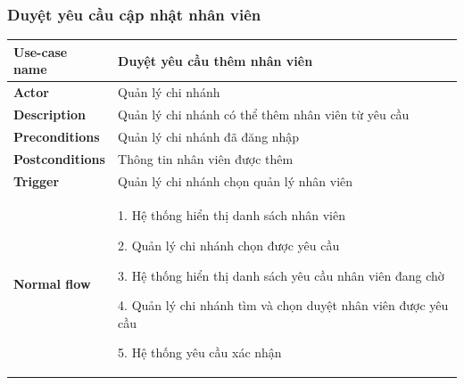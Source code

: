         \subsubsection{Duyệt yêu cầu cập nhật nhân viên}
        {
\setlength\extrarowheight{6pt}
            \begin{longtable}{| p{} | p{} |} 
                \hline
                    \textbf{Use-case name} 
                & 
                    Duyệt yêu cầu thêm nhân viên
                \\
                \hline
                    \textbf{Actor} 
                & 
                    Quản lý chi nhánh
                \\
                \hline
                    \textbf{Description} 
                & 
                    Quản lý chi nhánh có thể thêm nhân viên từ yêu cầu
                \\
                \hline
                    \textbf{Preconditions} 
                &
                    Quản lý chi nhánh đã đăng nhập
                \\
                \hline
                    \textbf{Postconditions} 
                & 
                    Thông tin nhân viên được thêm
                \\
                \hline
                    \textbf{Trigger} 
                & 
                    Quản lý chi nhánh chọn quản lý nhân viên
                \\
                \hline
                \begin{flushleft}
                    \textbf{Normal flow}
                \end{flushleft}
                & 
                1. Hệ thống hiển thị danh sách nhân viên
                    
                    2. Quản lý chi nhánh chọn được yêu cầu
                    
                    3. Hệ thống hiển thị danh sách yêu cầu nhân viên đang chờ
                    
                    4. Quản lý chi nhánh tìm và chọn duyệt nhân viên được yêu cầu
                    
                    5. Hệ thống yêu cầu xác nhận
                    

\end{longtable}}
